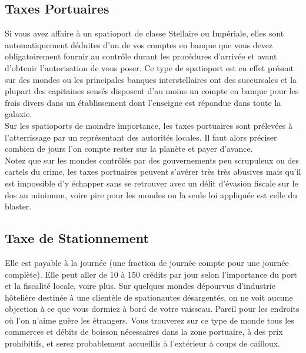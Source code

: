 \documentclass{article}
\begin{document}
\subsection*{Taxes Portuaires}
Si vous avez affaire à un spatioport de classe Stellaire ou Impériale, elles sont automatiquement déduites d'un de vos comptes en banque que vous devez obligatoirement fournir au contrôle durant les procédures d'arrivée et avant d'obtenir l'autorisation de vous poser. Ce type de spatioport est en effet présent sur des mondes ou les principales banques interstellaires ont des succursales et la plupart des capitaines sensés disposent d'au moins un compte en banque pour les frais divers dans un établissement dont l'enseigne est répandue dans toute la galaxie.\\

Sur les spatioports de moindre importance, les taxes portuaires sont prélevées à l'atterrissage par un représentant des autorités locales. Il faut alors préciser combien de jours l'on compte rester sur la planète et payer d'avance.\\

Notez que sur les mondes contrôlés par des gouvernements peu scrupuleux ou des cartels du crime, les taxes portuaires peuvent s'avérer très très abusives mais qu'il est impossible d'y échapper sans se retrouver avec un délit d'évasion fiscale sur le dos au minimum, voire pire pour les mondes ou la seule loi appliquée est celle du blaster.

\subsection*{Taxe de Stationnement}
Elle est payable à la journée (une fraction de journée compte pour une journée complète). Elle peut aller de 10 à 150 crédits par jour selon l'importance du port et la fiscalité locale, voire plus. Sur quelques mondes dépourvus d'industrie hôtelière destinée à une clientèle de spationautes désargentés, on ne voit aucune objection à ce que vous dormiez à bord de votre vaisseau. Pareil pour les endroits où l’on n’aime guère les étrangers. Vous trouverez sur ce type de monde tous les commerces et débits de boisson nécessaires dans la zone portuaire, à des prix prohibitifs, et serez probablement accueillis à l'extérieur à coups de cailloux.\\
\end{document}
